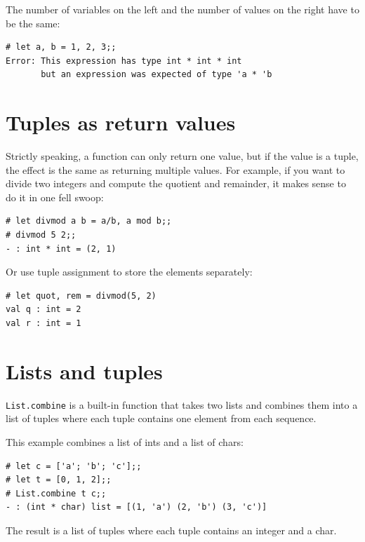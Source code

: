 \documentclass[10pt]{book}
\begin{document}
{The number of variables on the left and the number of
values on the right have to be the same:


\beforeverb
\begin{verbatim}
# let a, b = 1, 2, 3;;
Error: This expression has type int * int * int
       but an expression was expected of type 'a * 'b
\end{verbatim}
\afterverb
%

\section{Tuples as return values}


Strictly speaking, a function can only return one value, but
if the value is a tuple, the effect is the same as returning
multiple values.  For example, if you want to divide two integers
and compute the quotient and remainder, it makes sense to do it in 
one fell swoop:

\beforeverb
\begin{verbatim}
# let divmod a b = a/b, a mod b;;
# divmod 5 2;;
- : int * int = (2, 1)
\end{verbatim}
\afterverb
%
Or use tuple assignment to store the elements separately:


\beforeverb
\begin{verbatim}
# let quot, rem = divmod(5, 2)
val q : int = 2
val r : int = 1
\end{verbatim}
\afterverb

\section{Lists and tuples}


{\tt List.combine} is a built-in function that takes two lists and
combines them into a list of tuples where each tuple contains one 
element from each sequence.

This example combines a list of ints and a list of chars:

\beforeverb
\begin{verbatim}
# let c = ['a'; 'b'; 'c'];;
# let t = [0, 1, 2];;
# List.combine t c;;
- : (int * char) list = [(1, 'a') (2, 'b') (3, 'c')]
\end{verbatim}
\afterverb
%
The result is a list of tuples where each tuple contains
an integer and a char.

}
\end{document}
